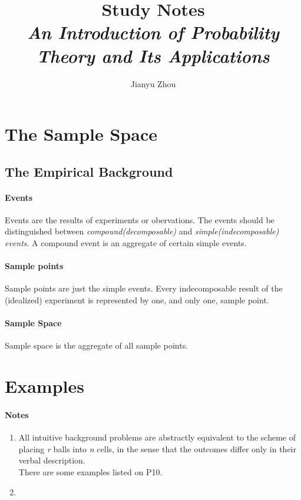 \documentclass{article}
\author{Jianyu Zhou}
\title{\textbf{Study Notes}\\ \textit{An Introduction of Probability Theory and Its Applications}}
\begin{document}
	\maketitle
	\section{The Sample Space}
	\subsection{The Empirical Background}
	\paragraph{Events} Events are the results of experiments or obervations.
	The events should be distinguished between \textit{compound(decomposable)} and \textit{simple(indecomposable) events}. A compound event is an aggregate of certain simple events.
	\paragraph{Sample points} Sample points are just the simple events. Every indecomposable result of the (idealized) experiment is represented by one, and only one, sample point.
	\paragraph{Sample Space} Sample space is the aggregate of all sample points.
	\section{Examples}
	\paragraph{Notes} 
	\begin{enumerate} 
	\item All intuitive background problems are abstractly equivalent to the scheme of placing \textit{r} balls into \textit{n} cells, in the sense that the outcomes differ only in their verbal description. \\There are some examples listed on P10.
	\item
	\end{enumerate}
\end{document}
